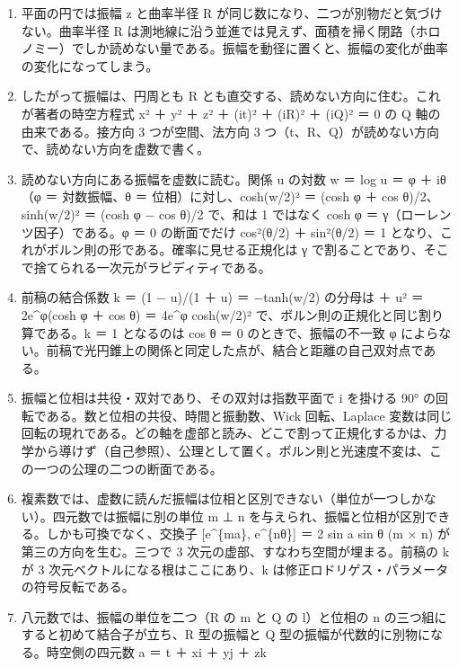 \documentclass[
  a4paper,
]{ltjsarticle}
\providecommand{\tightlist}{%
  \setlength{\itemsep}{0pt}\setlength{\parskip}{0pt}}
\begin{document}
\begin{enumerate}
\def\labelenumi{\arabic{enumi}.}
\tightlist
\item
  平面の円では振幅 \textbar z\textbar{} と曲率半径 R
  が同じ数になり、二つが別物だと気づけない。曲率半径 R
  は測地線に沿う並進では見えず、面積を掃く閉路（ホロノミー）でしか読めない量である。振幅を動径に置くと、振幅の変化が曲率の変化になってしまう。
\item
  したがって振幅は、円周とも R
  とも直交する、読めない方向に住む。これが著者の時空方程式 x² ＋ y² ＋
  z² ＋ (it)² ＋ (iR)² ＋ (iQ)² ＝ 0 の Q 軸の由来である。接方向 3
  つが空間、法方向 3
  つ（t、R、Q）が読めない方向で、読めない方向を虚数で書く。
\item
  読めない方向にある振幅を虚数に読む。関係 u の対数 w ＝ log u ＝ φ ＋
  iθ（φ ＝ 対数振幅、θ ＝ 位相）に対し、\textbar cosh(w/2)\textbar² ＝
  (cosh φ ＋ cos θ)/2、\textbar sinh(w/2)\textbar² ＝ (cosh φ − cos θ)/2
  で、和は 1 ではなく cosh φ ＝ γ（ローレンツ因子）である。φ ＝ 0
  の断面でだけ cos²(θ/2) ＋ sin²(θ/2) ＝ 1
  となり、これがボルン則の形である。確率に見せる正規化は γ
  で割ることであり、そこで捨てられる一次元がラピディティである。
\item
  前稿の結合係数 k ＝ (1 − u)/(1 ＋ u) ＝ −tanh(w/2) の分母は 
  ＋ u\textbar² ＝ 2e\^{}φ(cosh φ ＋ cos θ) ＝ 4e\^{}φ
  \textbar cosh(w/2)\textbar²
  で、ボルン則の正規化と同じ割り算である。\textbar k\textbar{} ＝ 1
  となるのは cos θ ＝ 0 のときで、振幅の不一致 φ
  によらない。前稿で光円錐上の関係と同定した点が、結合と距離の自己双対点である。
\item
  振幅と位相は共役・双対であり、その双対は指数平面で i を掛ける 90°
  の回転である。数と位相の共役、時間と振動数、Wick 回転、Laplace
  変数は同じ回転の現れである。どの軸を虚部と読み、どこで割って正規化するかは、力学から導けず（自己参照）、公理として置く。ボルン則と光速度不変は、この一つの公理の二つの断面である。
\item
  複素数では、虚数に読んだ振幅は位相と区別できない（単位が一つしかない）。四元数では振幅に別の単位
  m ⊥ n を与えられ、振幅と位相が区別できる。しかも可換でなく、交換子
  {[}e\^{}\{ma\}, e\^{}\{nθ\}{]} ＝ 2 sin a sin θ (m × n)
  が第三の方向を生む。三つで 3 次元の虚部、すなわち空間が埋まる。前稿の
  k が 3 次元ベクトルになる根はここにあり、k
  は修正ロドリゲス・パラメータの符号反転である。
\item
  八元数では、振幅の単位を二つ（R の m と Q の l）と位相の n
  の三つ組にすると初めて結合子が立ち、R 型の振幅と Q
  型の振幅が代数的に別物になる。時空側の四元数 a ＝ t ＋ xi ＋ yj ＋ zk

\end{enumerate}
\end{document}
